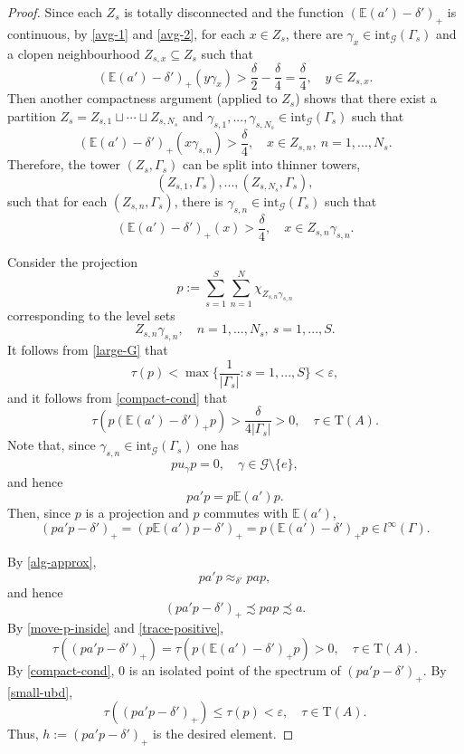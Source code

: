 \documentclass[10pt,a4paper]{amsart}
\newcommand{\abs}[1]{\left\vert#1\right\vert}
\newcommand{\eps}{\varepsilon}
\newcommand{\tr}{\mathrm{T}}
\begin{document}
\begin{proof}
Since each $Z_s$ is totally disconnected and the function $(\mathbb E(a') - \delta')_+$ is continuous, by \eqref{avg-1} and \eqref{avg-2}, for each $x \in Z_s$, there are $\gamma_x \in \mathrm{int}_{\mathcal G}(\Gamma_s)$ and a clopen neighbourhood $Z_{s, x} \subseteq Z_s$ such that 
$$(\mathbb E(a') - \delta')_+(y\gamma_{x}) > \frac{\delta}{2} - \frac{\delta}{4} =\frac{\delta}{4},\quad y \in Z_{s, x}.$$
Then another compactness argument (applied to $Z_s$) shows that there exist a partition $Z_s = Z_{s, 1} \sqcup \cdots \sqcup Z_{s, N_s}$ and $\gamma_{s, 1}, ..., \gamma_{s, N_s} \in \mathrm{int}_{\mathcal G}(\Gamma_s)$ such that 
$$(\mathbb E(a') - \delta')_+(x\gamma_{s, n}) > \frac{\delta}{4},\quad x \in Z_{s, n},\ n=1, ..., N_s.$$
Therefore, the tower $(Z_s, \Gamma_s)$ can be split into thinner towers, 
$$(Z_{s, 1}, \Gamma_s), ..., (Z_{s, N_s}, \Gamma_s), $$ 
such that for each $(Z_{s, n}, \Gamma_s)$, there is $\gamma_{s, n} \in \mathrm{int}_{\mathcal G}(\Gamma_s)$ such that 
\begin{equation}\label{compact-cond}
(\mathbb E(a') - \delta')_+(x) > \frac{\delta}{4}, \quad x\in Z_{s, n}\gamma_{s, n}. \end{equation} 

Consider the projection 
$$ p := \sum_{s=1}^S\sum_{n=1}^N \chi_{Z_{s, n}\gamma_{s, n}}$$ 
corresponding to the level sets $$Z_{s, n} \gamma_{s, n}, \quad n=1, ..., N_s, \ s = 1, ..., S.$$
It follows from \eqref{large-G} that
\begin{equation}\label{small-ubd}
\tau(p) < \max\{\frac{1}{\abs{\Gamma_s}}: s=1, ..., S \} <\eps,
\end{equation}
and it follows from \eqref{compact-cond} that 
\begin{equation}\label{trace-positive} 
\tau(p(\mathbb E(a') - \delta')_+p) > \frac{\delta}{4\abs{\Gamma_s}} > 0 ,\quad \tau \in \tr(A).
\end{equation}
Note that, since $\gamma_{s, n} \in \mathrm{int}_{\mathcal G}(\Gamma_s)$ one has
$$pu_\gamma p = 0,\quad \gamma \in \mathcal G\setminus\{e\},$$
and hence 
$$pa'p = p\mathbb E(a')p.$$
Then, since $p$ is a projection and $p$ commutes with $\mathbb E(a')$, 
\begin{equation}\label{move-p-inside}
 (pa'p - \delta')_+  = ( p\mathbb E(a') p - \delta')_+ = p( \mathbb E(a') - \delta')_+p \in l^\infty(\Gamma). 
\end{equation} 

By \eqref{alg-approx}, 
$$pa'p \approx_{\delta'} pap,$$
and hence 
$$(pa'p - {\delta'})_+ \precsim pap \precsim a.$$
By \eqref{move-p-inside} and \eqref{trace-positive}, 
$$ \tau((pa'p - \delta')_+)  =  \tau( p(\mathbb E(a') - \delta')_+p) >0, \quad \tau \in \tr(A).$$
By \eqref{compact-cond}, $0$ is an isolated point of the spectrum of $(pa'p - {\delta'})_+$. By \eqref{small-ubd}, $$\tau((pa'p - \delta')_+) \leq \tau(p) < \eps,\quad \tau \in \tr(A).$$
Thus, $h:= (pa'p - {\delta'})_+$ is the desired element.
\end{proof}
\end{document}
